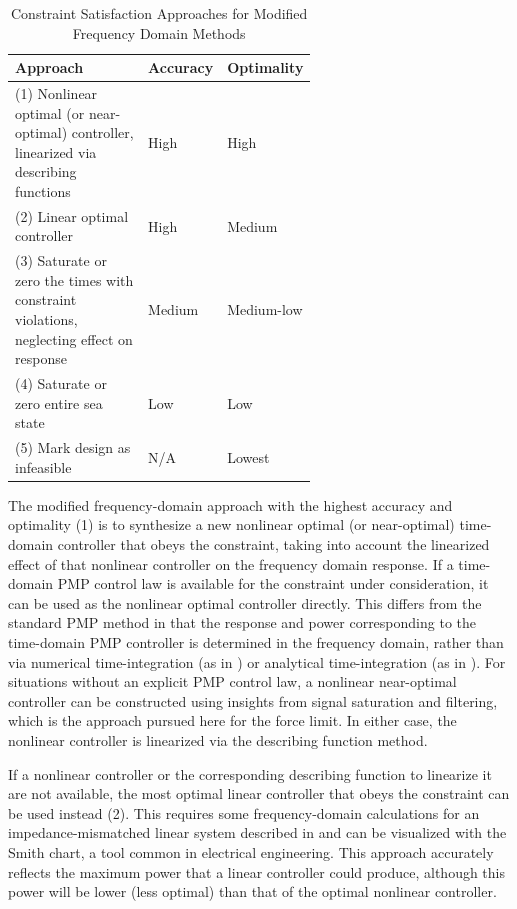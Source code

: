 \begin{table}
\centering

\begin{tabular}{>{\raggedright\arraybackslash}p{0.6\linewidth}l l} 
\textbf{Approach} & \textbf{Accuracy} & \textbf{Optimality} \\ \hline
(1) Nonlinear optimal (or near-optimal) controller, linearized via describing functions& High & High \\
(2) Linear optimal controller& High & Medium \\
(3) Saturate or zero the
times with constraint violations, neglecting effect on response& Medium & Medium-low\\
(4) Saturate or zero entire sea state& Low & Low \\
(5) Mark design as infeasible& N/A& Lowest \\

\end{tabular}
\caption{Constraint Satisfaction Approaches for Modified Frequency Domain Methods}
    \label{tab:constraint-approaches}
\end{table}

The modified frequency-domain approach with the highest accuracy and optimality (1) is to synthesize a new nonlinear optimal (or near-optimal) time-domain controller that obeys the constraint, taking into account the linearized effect of that nonlinear controller on the frequency domain response.
If a time-domain PMP control law is available for the constraint under consideration, it can be used as the nonlinear optimal controller directly.
This differs from the standard PMP method in that the response and power corresponding to the time-domain PMP controller is determined in the frequency domain, rather than via numerical time-integration (as in \cite{zou_optimal_2017}) or analytical time-integration (as in \cite{lin_fast_2025}).
For situations without an explicit PMP control law, a nonlinear near-optimal controller can be constructed using insights from signal saturation and filtering, which is the approach pursued here for the force limit.
In either case, the nonlinear controller is linearized via the describing function method.

If a nonlinear controller or the corresponding describing function to linearize it are not available, the most optimal linear controller that obeys the constraint can be used instead (2).
This requires some frequency-domain calculations for an impedance-mismatched linear system described in \cite{mccabe_force-limited_2024} and can be visualized with the Smith chart, a tool common in electrical engineering.
This approach accurately reflects the maximum power that a linear controller could produce, although this power will be lower (less optimal) than that of the optimal nonlinear controller. 

